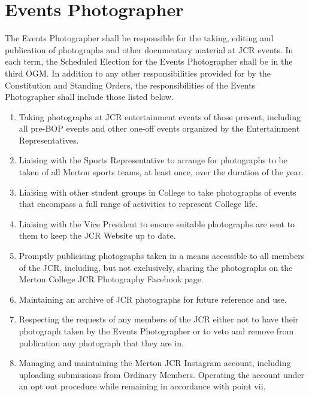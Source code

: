 \section{Events Photographer}
\npara The Events Photographer shall be responsible for the taking, editing and publication of photographs and other documentary material at JCR events.
\npara In each term, the Scheduled Election for the Events Photographer shall be in the third OGM.
\npara In addition to any other responsibilities provided for by the Constitution and Standing Orders, the responsibilities of the Events Photographer shall include those listed below.
\begin{enumerate}
	\item Taking photographs at JCR entertainment events of those present, including all pre-BOP events and other one-off events organized by the Entertainment Representatives.
	\item Liaising with the Sports Representative to arrange for photographs to be taken of all Merton sports teams, at least once, over the duration of the year.
	\item Liaising with other student groups in College to take photographs of events that encompass a full range of activities to represent College life.
	\item Liaising with the Vice President to ensure suitable photographs are sent to them to keep the JCR Website up to date.      
	\item Promptly publicising photographs taken in a means accessible to all members of the JCR, including, but not exclusively, sharing the photographs on the Merton College JCR Photography Facebook page.
	\item Maintaining an archive of JCR photographs for future reference and use.
	\item Respecting the requests of any members of the JCR either not to have their photograph taken by the Events Photographer or to veto and remove from publication any photograph that they are in.
	\item Managing and maintaining the Merton JCR Instagram account, including uploading submissions from Ordinary Members.  Operating the account under an opt out procedure while remaining in accordance with point vii.
\end{enumerate}
